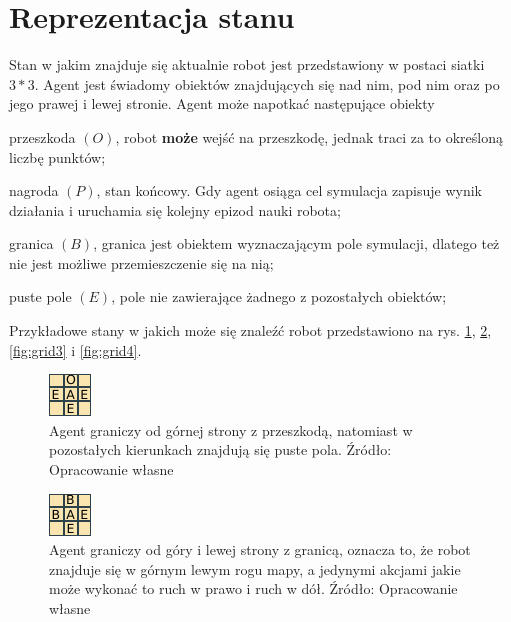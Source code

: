 \section{Reprezentacja stanu}
\label{sec:reprezentacjastanu}

Stan w jakim znajduje się aktualnie robot jest przedstawiony w postaci siatki $3*3$. Agent jest świadomy obiektów 
znajdujących się nad nim, pod nim oraz po jego prawej i lewej stronie.
Agent może napotkać następujące obiekty
\begin{description}
 \item przeszkoda $(O)$, robot \textbf{może} wejść na przeszkodę, jednak traci za to określoną liczbę punktów;
 \item nagroda $(P)$, stan końcowy. Gdy agent osiąga cel symulacja zapisuje wynik działania i uruchamia się kolejny 
epizod nauki robota;
 \item granica $(B)$, granica jest obiektem wyznaczającym pole symulacji, dlatego też nie jest możliwe przemieszczenie 
się na nią;
  \item puste pole $(E)$, pole nie zawierające żadnego z pozostałych obiektów;
\end{description}
 
Przykładowe stany w jakich może się znaleźć robot przedstawiono na rys. \ref{fig:grid1}, \ref{fig:grid2}, 
\ref{fig:grid3} i \ref{fig:grid4}.

\begin{figure}[h!]
    \centering
    \includegraphics[scale=10]{grid1}
    \caption{Agent graniczy od górnej strony z przeszkodą, natomiast w pozostałych kierunkach znajdują się puste pola. 
Źródło: Opracowanie własne}
    \label{fig:grid1}
\end{figure}

\begin{figure}[h!]
    \centering
    \includegraphics[scale=10]{grid2}
    \caption{Agent graniczy od góry i lewej strony z granicą, oznacza to, że robot znajduje się w górnym lewym rogu 
mapy, a jedynymi akcjami jakie może wykonać to ruch w prawo i ruch w dół. Źródło: Opracowanie własne}
    \label{fig:grid2}
\end{figure}

